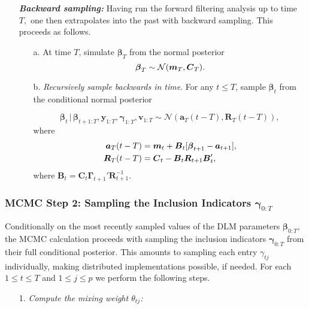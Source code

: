 \documentclass[ba]{imsart}
\numberwithin{equation}{section}
\theoremstyle{plain}
\def\a{\mbox{\boldmath$a$}}
\def\bR{\mbox{\boldmath$R$}}
\def\A{\mbox{\boldmath$A$}}
\def\bG{\bm{\Gamma}}
\def\bC{\mbox{\boldmath$C$}}
\def\x{\mbox{\boldmath$x$}}
\def\y{\mbox{\boldmath$y$}}
\def\b{\mbox{\boldmath$b$}}
\def\m{\mbox{\boldmath$m$}}
\def\seq#1#2{#1{:}#2}
\newcommand{\bm}[1]{\boldsymbol{#1}}
\def\A{\bm{A}}
\def\y{\bm{y}}
\def\bg{\bm{\gamma}}
\def\b{\bm{\beta}}
\begin{document}
{{\begin{itemize}
\begin{itemize}
	\item[3.]{\em  One-step-ahead predictive distribution:} At time $t-1$ compute
		$$
		y_t \,|\, \y_{\seq1{t-1}},  \bm v_{1:t} \sim \mathcal{N}(f_t,q_t),
		$$ 
		where
		$$
		f_t=\x_t'\a_{t}\quad \textrm{and}\quad q_t=\x_t'\bR_t\x_t+v_t.
		$$
		Observing $y_t$ produces the forecast error $e_t=y_t-f_t$.
	\item[4.]{\em  Posterior for  $\b_t$:} Given  current information up to time $t$, we have  
		\begin{align*}
		\b_{t}\,|\, \y_{\seq1{t}},\bg_{\seq1{t}},\bm v_{1:t}&\sim \mathcal{N}(\m_{t}, \bC_{t}),
		\end{align*}
		 with mean and covariance   $\m_t=\a_{t}+\A_t e_t$ and $ 	\bC_{t}=\bR_t-\bm A_t\bm A_t'q_t,$
		where $\A_t=\bR_t\x_t/q_t$. 
\end{itemize} 
	\item[]{\em\bf Backward sampling:}  Having run the forward filtering analysis up to time $T,$ one then extrapolates into the past with backward sampling. 
	This proceeds as follows.
	 \begin{itemize}
	 \item[a.] At time $T$, simulate $\b_T$ from the normal posterior 
	 $$
	 \b_T\sim\mathcal{N}(\m_T,\bC_T).
	 $$
	 \item[b.]{\em Recursively sample backwards in time}.  For any $t\leq T$,   sample  
	 	$\b_t$ from the conditional normal posterior 
	 			
				$$
				 \b_{t}\,|\, \b_{t+1:T}, \y_{\seq1T},\bg_{\seq1T},\bm v_{1:T}\sim \mathcal{N}\left(\bm a_T(t-T),\bm R_{T}(t-T)\right),
				$$ 
				where  
				\begin{align}
				\bm a_T(t-T)&=\bm \m_t +\bm B_t[\b_{t+1}- \bm a_{t+1} ],\\
				\bm R_T(t-T)&=\bm C_t-\bm B_t\bm R_{t+1}\bm B_t',
				\end{align}
				where $\bm B_t=\bm C_t\bG_{t+1}'\bm R_{t+1}^{-1}$. 				%
	 	 \end{itemize} 
\end{itemize} 
\subsubsection{MCMC   Step 2:   Sampling the Inclusion Indicators $\bg_{0:T}$}

 Conditionally on the most recently sampled values of the DLM parameters $\b_{0:T},$ the  MCMC calculation proceeds with sampling the 
inclusion indicators $\bg_{0:T}$ from their full conditional posterior. This amounts to   sampling   each entry $\gamma_{tj}$ individually,  making distributed implementations possible, if needed.
For each $1\leq t\leq T$ and $1\leq j\leq p$ we perform the following steps.
\begin{itemize} 
	\item[1.]{\em Compute the mixing weight $\theta_{tj}$:} 
	

\end{itemize}}}
\end{document}
